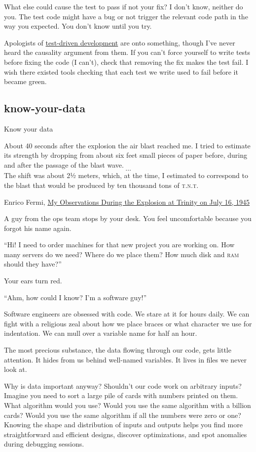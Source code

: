 \documentclass{article}
\begin{document}
What else could cause the test to pass if not your fix?
I don't know, neither do you.
The test code might have a bug or not trigger the relevant code path in the way you expected.
You don't know until you try.

Apologists of \href{https://en.wikipedia.org/wiki/Test-driven_development}{test-driven development} are onto something,
though I've never heard the causality argument from them.
If you can't force yourself to write tests before fixing the code (I can't),
check that removing the fix makes the test fail.
I wish there existed tools checking that each test we write used to fail before it became green.

\subsection{know-your-data}{Know your data}
\epigraph{
  About 40 seconds after the explosion the air blast reached me.
  I tried to estimate its strength by dropping from about six feet small pieces of paper before, during and after the passage of the blast wave.
  \[\ldots\]
  The shift was about 2½ meters, which, at the time, I estimated to correspond to the blast that would be produced by ten thousand tons of \textsc{t.n.t.}
}{Enrico Fermi, \href{https://www.atomicarchive.com/resources/documents/trinity/fermi.html}{My Observations During the Explosion at Trinity on July 16, 1945}}

A guy from the ops team stops by your desk. You feel uncomfortable because you forgot his name again.

``Hi! I need to order machines for that new project you are working on.
How many servers do we need?
Where do we place them?
How much disk and \textsc{ram} should they have?''

Your ears turn red.

``Ahm, how could I know? I'm a software guy!''

Software engineers are obsessed with code.
We stare at it for hours daily.
We can fight with a religious zeal about how we place braces or what character we use for indentation.
We can mull over a variable name for half an hour.

The most precious substance, the data flowing through our code, gets little attention.
It hides from us behind well-named variables.
It lives in files we never look at.

Why is data important anyway?
Shouldn't our code work on arbitrary inputs?
Imagine you need to sort a large pile of cards with numbers printed on them.
What algorithm would you use?
Would you use the same algorithm with a billion cards?
Would you use the same algorithm if all the numbers were zero or one?
Knowing the shape and distribution of inputs and outputs helps you find more straightforward and efficient designs, discover optimizations, and spot anomalies during debugging sessions.
\end{document}
